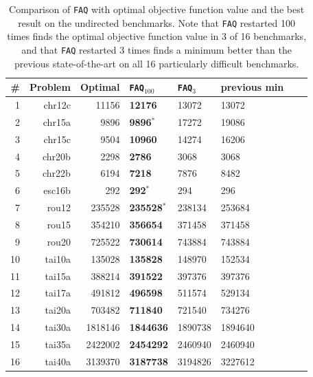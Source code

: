 \documentclass[11pt]{article}
\newcommand{\FAQ}{\texttt{FAQ} }
\begin{document}
\begin{table}[h!]
\caption{Comparison of \FAQ with optimal objective function value and the best result  on the undirected benchmarks.  Note that \FAQ restarted 100 times finds the optimal objective function value in 3 of 16 benchmarks, and that \FAQ restarted 3 times finds a minimum better than the previous state-of-the-art on all 16 particularly difficult benchmarks.}
\begin{center}
\begin{tabular}{|r|r|r||l|l|l|l|l|}
\hline
\# & Problem  &   Optimal    & \texttt{FAQ}$_{100}$ & \texttt{FAQ}$_{3}$ & previous min \\
\hline
1&    chr12c &   11156 &    \textbf{12176} &   13072 & 13072 \\
2&    chr15a &    9896 &    \textbf{9896}$^*$ &   17272 &  19086 \\
3&    chr15c &    9504 &    \textbf{10960} &   14274 &  16206 \\
4&   chr20b &    2298 &     \textbf{2786} &    3068 &    3068 \\
5&    chr22b &    6194 &    \textbf{7218} &    7876 &   8482 \\
6&    esc16b & 	292 & 		\textbf{292}$^*$ & 294 &    296 \\
7& 	   rou12 &  235528 &  \textbf{235528}$^*$ &  238134 &    253684 \\
8& 	   rou15 &  354210 &  \textbf{356654} &  371458 &    371458 \\
9&      rou20 &  725522 &  \textbf{730614} &  743884 &    743884 \\
10&    tai10a &  135028 &  \textbf{135828} &  148970 &    152534 \\
11&    tai15a &  388214 &  \textbf{391522} &  397376 &    397376 \\
12&    tai17a &  491812 &  \textbf{496598} &  511574 &    529134 \\
13&    tai20a &  703482 &  \textbf{711840} &  721540 &    734276 \\
14&    tai30a & 1818146 & \textbf{1844636} & 1890738 &  1894640 \\
15&    tai35a & 2422002 & \textbf{2454292} & 2460940 &  2460940 \\
16&    tai40a & 3139370 & \textbf{3187738} & 3194826 &  3227612 \\
    \hline
\end{tabular}
\end{center}
\label{tab:restarts}
\end{table}%
\end{document}
